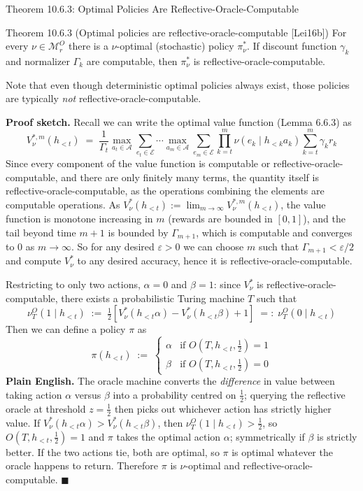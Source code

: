 \documentclass[aspectratio=169,10pt]{beamer}
\newcommand{\Mc}{\mathcal{M}}
\newcommand{\Ac}{\mathcal{A}}
\newcommand{\Ec}{\mathcal{E}}
\begin{document}
\begin{frame}[allowframebreaks]{Theorem 10.6.3: Optimal Policies Are Reflective-Oracle-Computable}
  \begin{block}{Theorem 10.6.3 (Optimal policies are reflective-oracle-computable {\footnotesize[Lei16b]})}
    For every $\nu\in\Mc_r^O$ there is a $\nu$-optimal (stochastic) policy
    $\pi^*_\nu$. If discount function $\gamma_k$ and normalizer $\Gamma_k$
    are computable, then $\pi^*_\nu$ is reflective-oracle-computable.
  \end{block}
  Note that even though deterministic optimal policies always exist, those
  policies are typically \emph{not} reflective-oracle-computable.

  \framebreak
  \textbf{Proof sketch.} Recall we can write the optimal value function
  (Lemma 6.6.3) as
  \[
    V_\nu^{*,m}(h_{<t}) \;=\; \frac{1}{\Gamma_t}\max_{a_t\in\Ac}\sum_{e_t\in\Ec}\cdots
    \max_{a_m\in\Ac}\sum_{e_m\in\Ec} \prod_{k=t}^{m}\nu(e_k\mid h_{<k}a_k)\sum_{k=t}^m \gamma_k r_k
  \]
  Since every component of the value function is computable or
  reflective-oracle-computable, and there are only finitely many terms,
  the quantity itself is reflective-oracle-computable, as the operations
  combining the elements are computable operations. As
  $V_\nu^*(h_{<t}):=\lim_{m\to\infty}V_\nu^{*,m}(h_{<t})$, the value
  function is monotone increasing in $m$ (rewards are bounded in $[0,1]$),
  and the tail beyond time $m+1$ is bounded by $\Gamma_{m+1}$, which is
  computable and converges to $0$ as $m\to\infty$. So for any desired
  $\varepsilon>0$ we can choose $m$ such that $\Gamma_{m+1}<\varepsilon/2$
  and compute $V_\nu^*$ to any desired accuracy, hence it is
  reflective-oracle-computable.

  \framebreak
  Restricting to only two actions, $\alpha=0$ and $\beta=1$: since $V_\nu^*$
  is reflective-oracle-computable, there exists a probabilistic Turing
  machine $T$ such that
  \[
    \nu_T^O(1\mid h_{<t}) \;:=\; \tfrac12\left[V_\nu^*(h_{<t}\alpha)-V_\nu^*(h_{<t}\beta)+1\right] \;=:\; \nu_T^O(0\mid h_{<t})
  \]
  Then we can define a policy $\pi$ as
  \[
    \pi(h_{<t}) \;:=\;
    \begin{cases}
      \alpha & \text{if } O(T,h_{<t},\tfrac12)=1 \\
      \beta & \text{if } O(T,h_{<t},\tfrac12)=0
    \end{cases}
  \]
  \textbf{Plain English.} The oracle machine converts the \emph{difference}
  in value between taking action $\alpha$ versus $\beta$ into a
  probability centred on $\tfrac12$; querying the reflective oracle at
  threshold $z=\tfrac12$ then picks out whichever action has strictly
  higher value. If $V_\nu^*(h_{<t}\alpha)>V_\nu^*(h_{<t}\beta)$, then
  $\nu_T^O(1\mid h_{<t})>\tfrac12$, so $O(T,h_{<t},\tfrac12)=1$ and $\pi$
  takes the optimal action $\alpha$; symmetrically if $\beta$ is strictly
  better. If the two actions tie, both are optimal, so $\pi$ is optimal
  whatever the oracle happens to return. Therefore $\pi$ is $\nu$-optimal
  and reflective-oracle-computable. $\blacksquare$
\end{frame}
\end{document}
